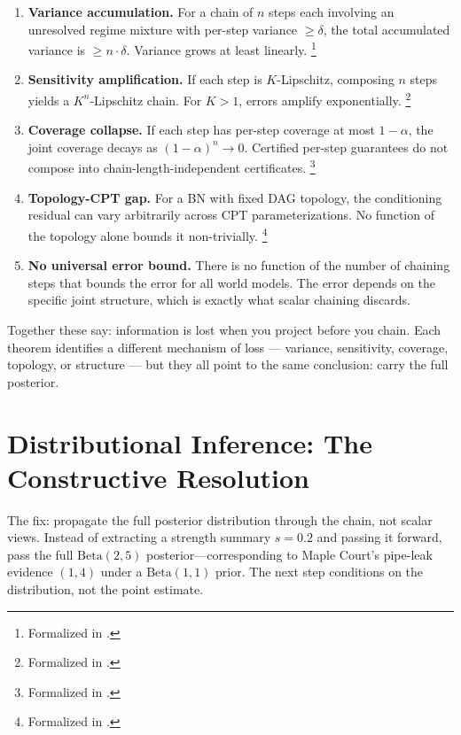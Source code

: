 \documentclass[11pt,openany]{report}
\begin{document}
\begin{enumerate}
\item \textbf{Variance accumulation.}  For a chain of $n$ steps each
  involving an unresolved regime mixture with per-step variance
  $\ge \delta$, the total accumulated variance is
  $\ge n \cdot \delta$.  Variance grows at least linearly.%
  \footnote{Formalized in
  .}

\item \textbf{Sensitivity amplification.}  If each step is
  $K$-Lipschitz, composing $n$ steps yields a $K^n$-Lipschitz chain.
  For $K > 1$, errors amplify exponentially.%
  \footnote{Formalized in
  .}

\item \textbf{Coverage collapse.}  If each step has per-step
  coverage at most $1 - \alpha$, the joint coverage decays as
  $(1 - \alpha)^n \to 0$.  Certified per-step guarantees do not
  compose into chain-length-independent certificates.%
  \footnote{Formalized in
  .}

\item \textbf{Topology-CPT gap.}  For a BN with fixed DAG topology,
  the conditioning residual can vary arbitrarily across CPT
  parameterizations.  No function of the topology alone bounds
  it non-trivially.%
  \footnote{Formalized in
  .}

\item \textbf{No universal error bound.}  There is no function of
  the number of chaining steps that bounds the error for all world
  models.  The error depends on the specific joint structure, which
  is exactly what scalar chaining discards.
\end{enumerate}

\noindent
Together these say: information is lost when you project before you
chain.  Each theorem identifies a different mechanism of loss ---
variance, sensitivity, coverage, topology, or structure --- but they
all point to the same conclusion: carry the full posterior.

\section{Distributional Inference: The Constructive Resolution}

The fix: propagate the full posterior distribution through the chain,
not scalar views.  Instead of extracting a strength summary $s = 0.2$
and passing it forward, pass the full $\text{Beta}(2, 5)$
posterior---corresponding to Maple Court's pipe-leak evidence $(1, 4)$
under a $\text{Beta}(1, 1)$ prior.  The next step conditions on the
distribution, not the point estimate.
\end{document}
